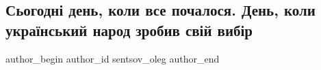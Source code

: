  
 
 
 
 
 
\subsection{Сьогодні день, коли все почалося. День, коли український народ зробив свій вибір}
\label{sec:21_11_2020.fb.sentsov_oleg.1.den_narod_vybir}
\ifcmt
	author_begin
   author_id sentsov_oleg
	author_end
\fi
